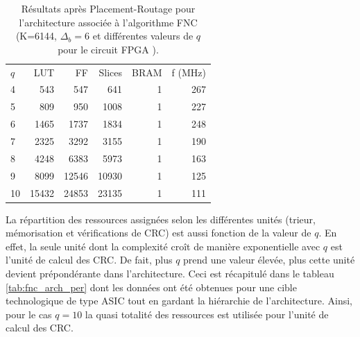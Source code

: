 \begin{table}[!b]
	\centering
	\caption{Résultats après Placement-Routage pour l'architecture associée à l'algorithme FNC (K=6144, 
	$\Delta_b = 6$ et différentes valeurs de $q$ pour le circuit FPGA  ). }
	\label{tab:fnc_impl_res_6}
	\begin{tabular}{lrrrrr} 
		\toprule
		$q$ & LUT   & FF    & Slices & BRAM & f (MHz) \\ 	\cmidrule(r){1-1}\cmidrule(l){2-6}
		4   & 543   & 547   & 641    & 1    & 267     \\ 
		5   & 809   & 950   & 1008   & 1    & 227     \\ 
		6   & 1465  & 1737  & 1834   & 1    & 248     \\ 
		7   & 2325  & 3292  & 3155   & 1    & 190     \\ 
		8   & 4248  & 6383  & 5973   & 1    & 163     \\ 
		9   & 8099  & 12546 & 10930  & 1    & 125     \\ 
		10  & 15432 & 24853 & 23135  & 1    & 111     \\ 
		\bottomrule 
	\end{tabular}
\end{table}

La répartition des ressources assignées selon les différentes unités (trieur, mémorisation et vérifications de CRC) est 
aussi fonction de la valeur de $q$. En effet, 
la seule unité dont la complexité croît de manière exponentielle avec $q$ est l'unité de calcul des CRC. De fait, plus $q$ prend une 
valeur élevée, plus cette unité devient prépondérante dans l'architecture. Ceci est récapitulé dans le tableau 
\ref{tab:fnc_arch_per} dont les données ont été obtenues pour une cible technologique de type ASIC tout en gardant la hiérarchie de 
l'architecture. Ainsi, pour le cas $q=10$ la quasi totalité des ressources est utilisée pour l'unité de calcul des CRC.


